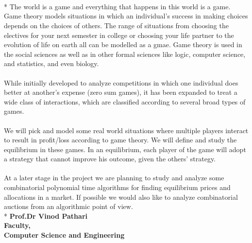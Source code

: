 \documentclass[12pt]{article}
\begin{document}

%
%
\makefrontpage
\setcounter{page}{2}
\setcounter{section}{0}
\pagestyle{plain}

\newpage

\\\\\\*
\small
\indent \indent The world is a game and everything that happens in this world is a game. Game theory models situations in which an individual's success in making choices depends on the choices of others. The range of situations from choosing the electives for your next semester in college or choosing your life partner to the evolution of life on earth all can be modelled as a gmae. Game theory is used in the social sciences as well as in other formal sciences like logic, computer science, and statistics, and even biology. \\\\
\indent \indent While initially developed to analyze competitions in which one individual does better at another's expense (zero sum games), it has been expanded to treat a wide class of interactions, which are classified according to several broad types of games.\\\\
\indent \indent We will pick and model some real world situations where multiple players interact to result in profit/loss according to game theory. We will define and study the equilibrium in these games. In an equilibrium, each player of the game will adopt a strategy that cannot improve his outcome, given the others' strategy.\\\\
\indent \indent At a later stage in the project we are planning to study and analyze some combinatorial polynomial time algorithms for finding equilibrium prices and allocations in a market. If possible we would also like to analyze combinatorial auctions from an algorithmic point of view.
\vspace{10cm}\\*
\large\bf{Prof.Dr Vinod Pathari}\\
\normalfont
Faculty,\\
Computer Science and Engineering

\newpage
\end{document}
